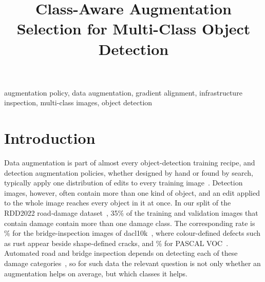 
\title{Class-Aware Augmentation Selection for Multi-Class Object Detection}
\maketitle


\begin{IEEEkeywords}
augmentation policy, data augmentation, gradient alignment, infrastructure inspection, multi-class images, object detection
\end{IEEEkeywords}

\section{Introduction}
\label{sec:intro}

Data augmentation is part of almost every object-detection training recipe, and detection augmentation policies, whether designed by hand or found by search, typically apply one distribution of edits to every training image~\cite{zoph2020det,chen2021scale}. Detection images, however, often contain more than one kind of object, and an edit applied to the whole image reaches every object in it at once. In our split of the RDD2022 road-damage dataset~\cite{arya2024rdd}, 35\% of the training and validation images that contain damage contain more than one damage class. The corresponding rate is \% for the bridge-inspection images of dacl10k~\cite{flotzinger2024dacl10k}, where colour-defined defects such as rust appear beside shape-defined cracks, and \% for PASCAL VOC~\cite{everingham2010voc}. Automated road and bridge inspection depends on detecting each of these damage categories~\cite{shang2024automated,zheng2024deep,vision2025inspection}, so for such data the relevant question is not only whether an augmentation helps on average, but which classes it helps.

